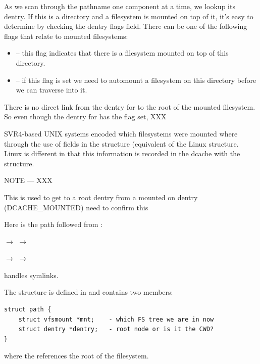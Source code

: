 As we scan through the pathname one component at a time, we lookup its dentry. If this is a directory and a filesystem is mounted on top of it, it's easy to determine by checking the dentry flags field. There can be one of the following flags that relate to mounted filesystems:

\begin{itemize}
	\item {} -- this flag indicates that there is a filesystem mounted on top of this directory. 
	\item {} -- if this flag is set we need to automount a filesystem on this directory 
		before we can traverse into it. 
\end{itemize}

\noindent
There is no direct link from the dentry for  to the root of the mounted filesystem. So even though the dentry for  has the  flag set, XXX

SVR4-based UNIX systems encoded which filesystems were mounted where through the use of fields in the  structure (equivalent of the Linux  structure. Linux is different in that this information is recorded in the dcache with the  structure.

NOTE --- XXX

This is used to get to a root dentry from a mounted on dentry (DCACHE\_MOUNTED) need to confirm this

\noindent
Here is the path followed from :

\small
\bigskip 
{} $\rightarrow$  $\rightarrow$   

\vspace{1pt}
\hspace{1.53in}
$\rightarrow$   $\rightarrow$ 
\bigskip 
\normalsize

\noindent
{} handles symlinks.

The  structure is defined in  and contains two members:

\begin{lstlisting}
struct path {
    struct vfsmount *mnt;    - which FS tree we are in now
    struct dentry *dentry;   - root node or is it the CWD?
}
\end{lstlisting}

\noindent
where the  references the root of the filesystem.

